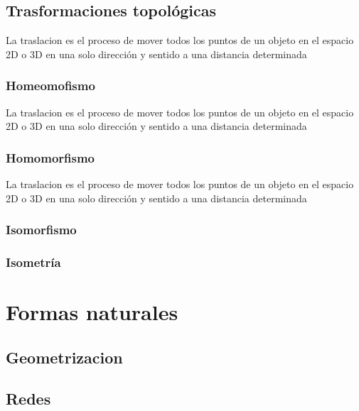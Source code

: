 \documentclass[
  16pt,
]{krantz}
\theoremstyle{definition}
\theoremstyle{definition}
\theoremstyle{definition}
\theoremstyle{definition}
\theoremstyle{remark}
\begin{document}
\hypertarget{trasformaciones-topoluxf3gicas}{%
\section{Trasformaciones topológicas}\label{trasformaciones-topoluxf3gicas}}

La traslacion es el proceso de mover todos los puntos de un objeto en el espacio 2D o 3D en una solo dirección y sentido a una distancia determinada

\hypertarget{homeomofismo}{%
\subsection{Homeomofismo}\label{homeomofismo}}

La traslacion es el proceso de mover todos los puntos de un objeto en el espacio 2D o 3D en una solo dirección y sentido a una distancia determinada

\hypertarget{homomorfismo}{%
\subsection{Homomorfismo}\label{homomorfismo}}

La traslacion es el proceso de mover todos los puntos de un objeto en el espacio 2D o 3D en una solo dirección y sentido a una distancia determinada \citep{xie2015}

\hypertarget{isomorfismo}{%
\subsection{Isomorfismo}\label{isomorfismo}}

\hypertarget{isometruxeda}{%
\subsection{Isometría}\label{isometruxeda}}

\hypertarget{formas-naturales}{%
\chapter{Formas naturales}\label{formas-naturales}}

\hypertarget{geometrizacion}{%
\section{Geometrizacion}\label{geometrizacion}}

\hypertarget{redes}{%
\section{Redes}\label{redes}}
\end{document}

